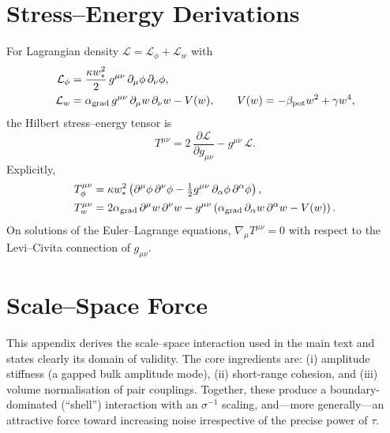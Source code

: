 \documentclass[11pt]{article}
\begin{document}
\section{Stress--Energy Derivations}\label{app:tmn}
For Lagrangian density $\mathcal L=\mathcal L_\phi+\mathcal L_w$ with
\begin{align}
  \mathcal L_\phi &= \frac{\kappa w_*^2}{2}\,g^{\mu\nu}\,\partial_\mu\phi\,\partial_\nu\phi,\\
  \mathcal L_w &= \alpha_{\rm grad}\,g^{\mu\nu}\,\partial_\mu w\,\partial_\nu w - V(w),\qquad V(w)=-\beta_{\rm pot}w^2+\gamma w^4,
\end{align}
the Hilbert stress--energy tensor is
\begin{equation}
  T^{\mu\nu} = 2\,\frac{\partial \mathcal L}{\partial g_{\mu\nu}} - g^{\mu\nu}\,\mathcal L.
\end{equation}
Explicitly,
\begin{align}
  T^{\mu\nu}_{\phi} &= \kappa w_*^2\left(\partial^{\mu}\phi\,\partial^{\nu}\phi - \tfrac12 g^{\mu\nu}\,\partial_\alpha\phi\,\partial^{\alpha}\phi\right),\\
  T^{\mu\nu}_{w} &= 2\alpha_{\rm grad}\,\partial^{\mu}w\,\partial^{\nu}w - g^{\mu\nu}\left(\alpha_{\rm grad}\,\partial_\alpha w\,\partial^{\alpha}w - V(w)\right).
\end{align}
On solutions of the Euler--Lagrange equations, $\nabla_\mu T^{\mu\nu}=0$ with respect to the Levi--Civita connection of $g_{\mu\nu}$.


\section{Scale--Space Force}
\label{app:scalespace}
This appendix derives the scale--space interaction used in the main text and states clearly its domain of validity. The core ingredients are: (i) amplitude stiffness (a gapped bulk amplitude mode), (ii) short-range cohesion, and (iii) volume normalisation of pair couplings. Together, these produce a boundary-dominated (``shell'') interaction with an $\sigma^{-1}$ scaling, and—more generally—an attractive force toward increasing noise irrespective of the precise power of $\tau$.
\end{document}
